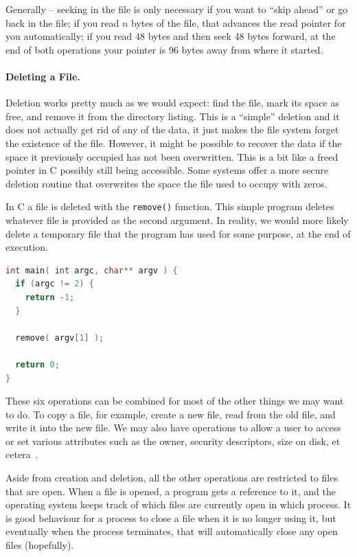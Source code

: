 Generally -- seeking in the file is only necessary if you want to ``skip ahead'' or go back in the file; if you read $n$ bytes of the file, that advances the read pointer for you automatically; if you read 48 bytes and then seek 48 bytes forward, at the end of both operations your pointer is 96 bytes away from where it started.

\paragraph{Deleting a File.} Deletion works pretty much as we would expect: find the file, mark its space as free, and remove it from the directory listing. This is a ``simple'' deletion and it does not actually get rid of any of the data, it just makes the file system forget the existence of the file. However, it might be possible to recover the data if the space it previously occupied has not been overwritten. This is a bit like a freed pointer in C possibly still being accessible. Some systems offer a more secure deletion routine that overwrites the space the file used to occupy with zeros.

In C a file is deleted with the \texttt{remove()} function. This simple program deletes whatever file is provided as the second argument. In reality, we would more likely delete a temporary file that the program has used for some purpose, at the end of execution.

\begin{lstlisting}[language=C]
int main( int argc, char** argv ) {
  if (argc != 2) {
    return -1;
  }
  
  remove( argv[1] );

  return 0;
}    
\end{lstlisting}


These six operations can be combined for most of the other things we may want to do. To copy a file, for example, create a new file, read from the old file, and write it into the new file. We may also have operations to allow a user to access or set various attributes such as the owner, security descriptors, size on disk, et cetera~\cite{osc}.

Aside from creation and deletion, all the other operations are restricted to files that are open. When a file is opened, a program gets a reference to it, and the operating system keeps track of which files are currently open in which process. It is good behaviour for a process to close a file when it is no longer using it, but eventually when the process terminates, that will automatically close any open files (hopefully).

